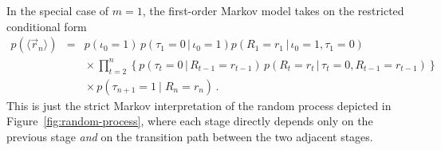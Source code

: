 \documentclass[a4paper]{article}
\begin{document}
In the special case of $m=1$, the first-order Markov model takes on the restricted conditional form
\begin{eqnarray}
p(\langle\vec{r}_n\rangle) & = &
p(\iota_0=1)\,p(\tau_1\!=\!0\,|\,\iota_0\!=\!1)
p(R_1\!=\!r_1\,|\,\iota_0\!=\!1,\tau_1\!=\!0)
\nonumber\\&&
{}\times\prod_{t=2}^{n}\left\{p(\tau_t\!=\!0\,|\,R_{t-1}\!=\!r_{t-1})
\,p(R_t\!=\!r_t\,|\,\tau_t\!=\!0,R_{t-1}\!=\!r_{t-1})\right\}
\nonumber\\&&
{}\times p(\tau_{n+1}\!=\!1\:|\;R_n\!=\!r_n)
\,.
\end{eqnarray}
This is just the strict Markov interpretation of the random process depicted in Figure~\ref{fig:random-process},
where each stage directly depends only on the previous stage {\em and} on the transition path between the two adjacent stages.
\end{document}
